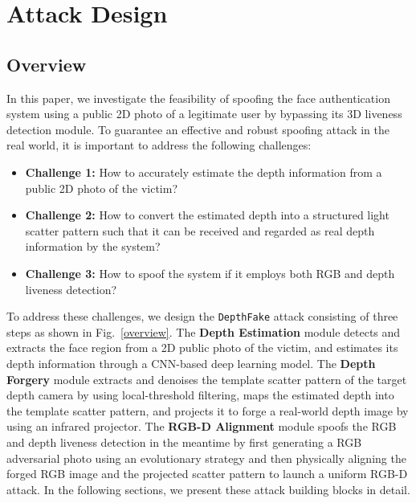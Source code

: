 \section{Attack Design}

\subsection{Overview}
 In this paper, we investigate the feasibility of spoofing the face authentication system using a public 2D photo of a legitimate user by bypassing its 3D liveness detection module. 
 To guarantee an effective and robust spoofing attack in the real world, it is important to address the following  challenges:

\begin{itemize}
	\item \textbf{Challenge 1:} 
	How to accurately estimate the depth information from a public 2D photo of the victim?
	\item \textbf{Challenge 2:} 
	How to convert the estimated depth into a structured light scatter pattern such that it can be received and regarded as  real depth information by the system?
	\item \textbf{Challenge 3:} 
	How to spoof the system if it employs both RGB and depth liveness detection?

\end{itemize}

To address these challenges, we design the \texttt{DepthFake} attack consisting of three steps as shown in Fig.~\ref{overview}. 
The \textbf{Depth Estimation} module detects and extracts the face region from a 2D public photo of the victim, and estimates its depth information through a CNN-based deep learning model. 
The \textbf{Depth Forgery} module extracts and denoises the template scatter pattern of the target depth camera by using local-threshold filtering, maps the estimated depth  into the template scatter pattern, and projects it to forge a real-world depth image by using an infrared projector. 
The \textbf{RGB-D Alignment} module spoofs the RGB and depth liveness detection 
in the meantime by first generating a RGB adversarial photo using an evolutionary strategy and then physically aligning the forged RGB image and the projected scatter pattern to launch a uniform RGB-D attack.
In the following sections, we present these attack building blocks in detail.

